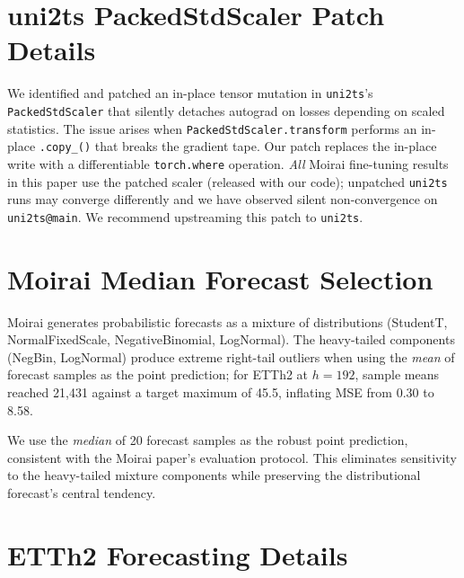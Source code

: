 \section{uni2ts PackedStdScaler Patch Details}
\label{app:scaler_patch}

We identified and patched an in-place tensor mutation in
\texttt{uni2ts}'s \texttt{PackedStdScaler} that silently detaches
autograd on losses depending on scaled statistics.  The issue arises
when \texttt{PackedStdScaler.transform} performs an in-place
\texttt{.copy\_()} that breaks the gradient tape.  Our patch replaces
the in-place write with a differentiable \texttt{torch.where}
operation.  \emph{All} Moirai fine-tuning results in this paper use
the patched scaler (released with our code); unpatched
\texttt{uni2ts} runs may converge differently and we have observed
silent non-convergence on \texttt{uni2ts@main}.  We recommend
upstreaming this patch to \texttt{uni2ts}.

\section{Moirai Median Forecast Selection}
\label{app:moirai_median}

Moirai generates probabilistic forecasts as a mixture of
distributions (StudentT, NormalFixedScale, NegativeBinomial,
LogNormal).  The heavy-tailed components (NegBin, LogNormal) produce
extreme right-tail outliers when using the \emph{mean} of forecast
samples as the point prediction; for ETTh2 at $h{=}192$, sample
means reached 21{,}431 against a target maximum of 45.5, inflating
MSE from 0.30 to 8.58.

We use the \emph{median} of 20 forecast samples as the robust point
prediction, consistent with the Moirai paper's evaluation protocol.
This eliminates sensitivity to the heavy-tailed mixture components
while preserving the distributional forecast's central tendency.

\section{ETTh2 Forecasting Details}
\label{app:etth2_details}

